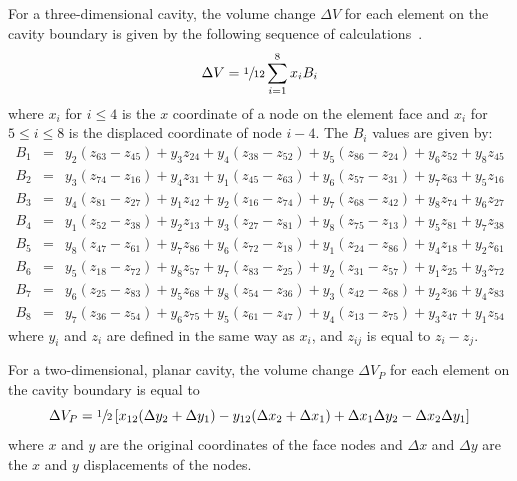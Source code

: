 For a three-dimensional cavity, the volume change $\Delta V$ for each
element on the cavity boundary is given by the following sequence of
calculations~\cite{PRONTO3D}.
\begin{equation}
\Delta V = \sfrac{1}{12}\sum_{i=1}^8 x_i B_i
\end{equation}
where $x_i$ for $i\le 4$ is the $x$ coordinate of a node on the element
face and $x_i$ for $5 \le i\le 8$ is the displaced coordinate of node
$i-4$.  The $B_i$ values are given by:
\begin{eqnarray*}
B_{1} &=&   y_2 (z_{63}-z_{45}) + y_3 z_{24} + y_4 (z_{38}-z_{52})
          + y_5 (z_{86}-z_{24}) + y_6 z_{52} + y_8 z_{45} \\
B_{2} &=&   y_3 (z_{74}-z_{16}) + y_4 z_{31} + y_1 (z_{45}-z_{63})
          + y_6 (z_{57}-z_{31}) + y_7 z_{63} + y_5 z_{16} \\
B_{3} &=&   y_4 (z_{81}-z_{27}) + y_1 z_{42} + y_2 (z_{16}-z_{74})
          + y_7 (z_{68}-z_{42}) + y_8 z_{74} + y_6 z_{27} \\
B_{4} &=&   y_1 (z_{52}-z_{38}) + y_2 z_{13} + y_3 (z_{27}-z_{81})
          + y_8 (z_{75}-z_{13}) + y_5 z_{81} + y_7 z_{38} \\
B_{5} &=&   y_8 (z_{47}-z_{61}) + y_7 z_{86} + y_6 (z_{72}-z_{18})
          + y_1 (z_{24}-z_{86}) + y_4 z_{18} + y_2 z_{61} \\
B_{6} &=&   y_5 (z_{18}-z_{72}) + y_8 z_{57} + y_7 (z_{83}-z_{25})
          + y_2 (z_{31}-z_{57}) + y_1 z_{25} + y_3 z_{72} \\
B_{7} &=&   y_6 (z_{25}-z_{83}) + y_5 z_{68} + y_8 (z_{54}-z_{36})
          + y_3 (z_{42}-z_{68}) + y_2 z_{36} + y_4 z_{83} \\
B_{8} &=&   y_7 (z_{36}-z_{54}) + y_6 z_{75} + y_5 (z_{61}-z_{47})
          + y_4 (z_{13}-z_{75}) + y_3 z_{47} + y_1 z_{54}
\end{eqnarray*}
where $y_i$ and $z_i$ are defined in the same way as $x_i$, and $z_{ij}$
is equal to $z_i - z_j$.

For a two-dimensional, planar cavity, the volume change $\Delta V_P$ for
each element on the cavity boundary is equal to
\begin{equation}
\Delta V_P = \sfrac{1}{2}\left[x_{12} (\Delta y_2 + \Delta y_1) -
           y_{12} (\Delta x_2 + \Delta x_1) +
           \Delta x_1 \Delta y_2 -
           \Delta x_2 \Delta y_1\right]
\end{equation}
where $x$ and $y$ are the original coordinates of the face nodes and
$\Delta x$ and $\Delta y$ are the $x$ and $y$ displacements of the
nodes.

